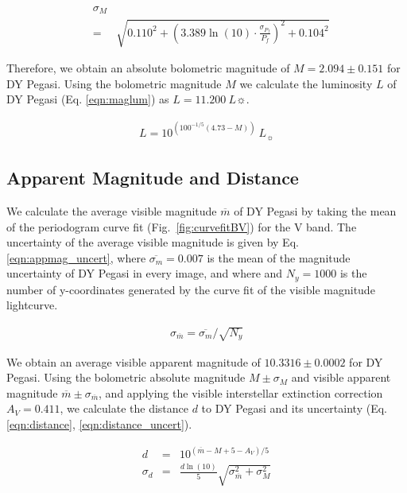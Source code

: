 \documentclass[twocolumn]{aastex631}
\begin{document}
\begin{eqnarray}
    &\sigma_M& \nonumber \\
    &=& \sqrt{0.110^2 + \left( 3.389 \ln(10) \cdot \frac{\sigma_{P_f}}{P_f} \right)^2 + 0.104^2}
                \label{eqn:periodlum_uncert}
\end{eqnarray}

Therefore, we obtain an absolute bolometric magnitude of $M = 2.094 \pm 0.151$ for DY Pegasi. Using the bolometric magnitude $M$ we calculate the luminosity $L$ of DY Pegasi (Eq. \ref{eqn:maglum}) as $L = 11.200 \ L\sun$.

\begin{eqnarray}
    L = 10 ^ {\left( 100^{-1/5} (4.73 - M) \right)} \ L_\sun \label{eqn:maglum}
\end{eqnarray}


\subsection{Apparent Magnitude and Distance\label{subsec:distance}}

We calculate the average visible magnitude $\overline{m}$ of DY Pegasi by taking the mean of the periodogram curve fit (Fig.\ \ref{fig:curvefitBV}) for the V band. The uncertainty of the average visible magnitude is given by Eq. \ref{eqn:appmag_uncert}, where $\overline{\sigma_m} = 0.007$ is the mean of the magnitude uncertainty of DY Pegasi in every image, and where and $N_y = 1000$ is the number of y-coordinates generated by the curve fit of the visible magnitude lightcurve.

\begin{eqnarray}
    \sigma_{\overline{m}} = \overline{\sigma_m} / \sqrt{N_y}  \label{eqn:appmag_uncert}
\end{eqnarray}

We obtain an average visible apparent magnitude of $10.3316 \pm 0.0002$ for DY Pegasi. Using the bolometric absolute magnitude $M \pm \sigma_M$ and visible apparent magnitude $\overline{m} \pm \sigma_{\overline{m}}$, and applying the visible interstellar extinction correction $A_V = 0.411$, we calculate the distance $d$ to DY Pegasi and its uncertainty (Eq. \ref{eqn:distance}, \ref{eqn:distance_uncert}).

\begin{eqnarray}
    d &=& 10^{(\overline{m} - M + 5 - A_V) / 5} \label{eqn:distance}\\
    \sigma_d &=& \frac{d\ln(10)}{5} \sqrt{ \sigma_{\overline{m}}^2 + \sigma_M^2 } \label{eqn:distance_uncert}
\end{eqnarray}
\end{document}
